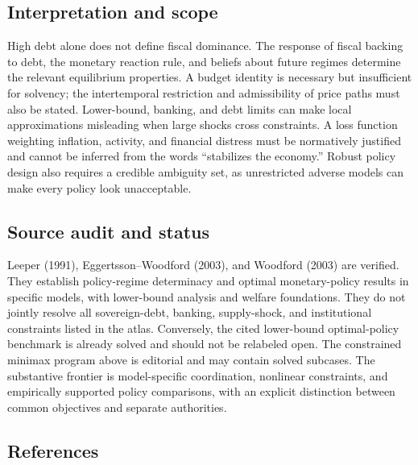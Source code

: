 \documentclass[11pt,a4paper]{article}
\begin{document}
\subsection*{Interpretation and scope}

High debt alone does not define fiscal dominance. The response of fiscal backing to debt, the monetary reaction rule, and beliefs about future regimes determine the relevant equilibrium properties. A budget identity is necessary but insufficient for solvency; the intertemporal restriction and admissibility of price paths must also be stated. Lower-bound, banking, and debt limits can make local approximations misleading when large shocks cross constraints. A loss function weighting inflation, activity, and financial distress must be normatively justified and cannot be inferred from the words ``stabilizes the economy.'' Robust policy design also requires a credible ambiguity set, as unrestricted adverse models can make every policy look unacceptable.

\subsection*{Source audit and status}

Leeper (1991), Eggertsson--Woodford (2003), and Woodford (2003) are verified. They establish policy-regime determinacy and optimal monetary-policy results in specific models, with lower-bound analysis and welfare foundations. They do not jointly resolve all sovereign-debt, banking, supply-shock, and institutional constraints listed in the atlas. Conversely, the cited lower-bound optimal-policy benchmark is already solved and should not be relabeled open. The constrained minimax program above is editorial and may contain solved subcases. The substantive frontier is model-specific coordination, nonlinear constraints, and empirically supported policy comparisons, with an explicit distinction between common objectives and separate authorities.

\subsection*{References}
\end{document}
